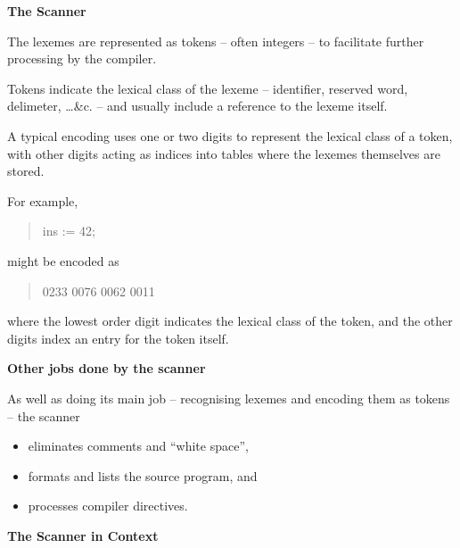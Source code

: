 %
%
\begin{slide}{}
{\small
{\bf The Scanner}

The lexemes are represented as tokens -- often integers -- to 
facilitate further processing by the compiler.

Tokens indicate the lexical class of the lexeme -- identifier,
reserved word, delimeter, \ldots \&c. -- and usually include
a reference to the lexeme itself.

A typical encoding uses one or two digits to represent the lexical
class of a token, with other digits acting as indices into tables
where the lexemes themselves are stored.

For example,
\begin{quote}

    ins := 42;

\end{quote}
might be encoded as
\begin{quote}

    0233 0076 0062 0011

\end{quote}
where the lowest order digit indicates the lexical class
of the token, and the other digits index an entry for
the token itself.
}
\end{slide}
%
%
\begin{slide}{}
{\bf Other jobs done by the scanner}

As well as doing its main job -- recognising lexemes
and encoding them as tokens -- the scanner
\begin{itemize}
\item eliminates comments and ``white space'',
\item formats and lists the source program, and
\item processes compiler directives.
\end{itemize}

\end{slide}
%
%
\begin{slide}{}
{\bf The Scanner in Context}

\vspace{3ex}

\end{slide}
